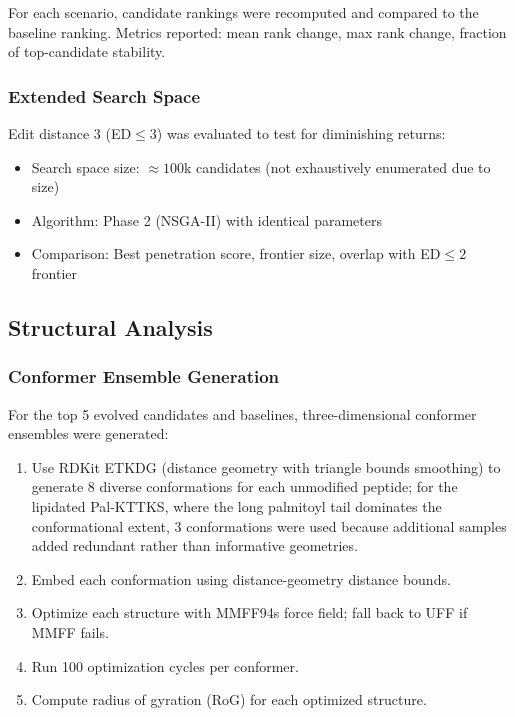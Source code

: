\documentclass[11pt,letterpaper]{article}
\begin{document}
For each scenario, candidate rankings were recomputed and compared to the baseline ranking. Metrics reported: mean rank change, max rank change, fraction of top-candidate stability.

\subsubsection{Extended Search Space}

Edit distance 3 (ED$\leq 3$) was evaluated to test for diminishing returns:
\begin{itemize}
  \item Search space size: $\approx 100$k candidates (not exhaustively enumerated due to size)
  \item Algorithm: Phase 2 (NSGA-II) with identical parameters
  \item Comparison: Best penetration score, frontier size, overlap with ED$\leq 2$ frontier
\end{itemize}

\subsection{Structural Analysis}

\subsubsection{Conformer Ensemble Generation}

For the top 5 evolved candidates and baselines, three-dimensional conformer ensembles were generated:
\begin{enumerate}
  \item Use RDKit ETKDG (distance geometry with triangle bounds smoothing) to generate 8 diverse conformations for each unmodified peptide; for the lipidated Pal-KTTKS, where the long palmitoyl tail dominates the conformational extent, 3 conformations were used because additional samples added redundant rather than informative geometries.
  \item Embed each conformation using distance-geometry distance bounds.
  \item Optimize each structure with MMFF94s force field; fall back to UFF if MMFF fails.
  \item Run 100 optimization cycles per conformer.
  \item Compute radius of gyration (RoG) for each optimized structure.
\end{enumerate}
\end{document}
